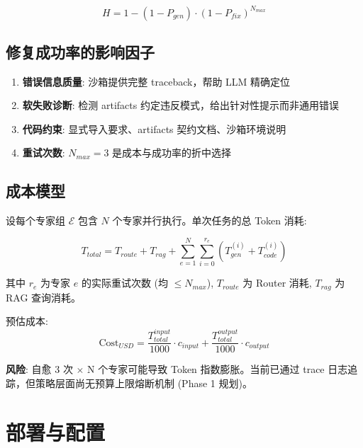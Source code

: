 \documentclass[12pt,a4paper]{article}
\begin{document}
\begin{equation}
H = 1 - (1 - P_{gen}) \cdot (1 - P_{fix})^{N_{max}}
\end{equation}

\subsection{修复成功率的影响因子}

\begin{enumerate}[nosep]
    \item \textbf{错误信息质量}: 沙箱提供完整 traceback，帮助 LLM 精确定位
    \item \textbf{软失败诊断}: 检测 artifacts 约定违反模式，给出针对性提示而非通用错误
    \item \textbf{代码约束}: 显式导入要求、artifacts 契约文档、沙箱环境说明
    \item \textbf{重试次数}: $N_{max} = 3$ 是成本与成功率的折中选择
\end{enumerate}

\subsection{成本模型}

设每个专家组 $\mathcal{E}$ 包含 $N$ 个专家并行执行。单次任务的总 Token 消耗:

\begin{equation}
T_{total} = T_{route} + T_{rag} + \sum_{e=1}^{N} \sum_{i=0}^{r_e} (T_{gen}^{(i)} + T_{code}^{(i)})
\end{equation}

其中 $r_e$ 为专家 $e$ 的实际重试次数 (均 $\leq N_{max}$), $T_{route}$ 为 Router 消耗, $T_{rag}$ 为 RAG 查询消耗。

预估成本:
\begin{equation}
\text{Cost}_{USD} = \frac{T_{total}^{input}}{1000} \cdot c_{input} + \frac{T_{total}^{output}}{1000} \cdot c_{output}
\end{equation}

\textbf{风险}: 自愈 3 次 $\times$ N 个专家可能导致 Token 指数膨胀。当前已通过 trace 日志追踪，但策略层面尚无预算上限熔断机制 (Phase 1 规划)。

\newpage

\section{部署与配置}
\end{document}
